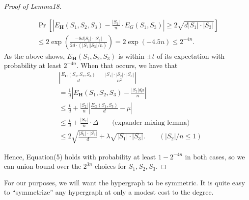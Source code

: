 \begin{proof}[Proof of Lemma18]
\begin{enumerate}
\begin{multline*}
\Pr\left[\left|E_{\mathbf H}(S_1,S_2,S_3)-\frac{|S_2|}n\cdot E_G(S_1,S_3)\right|\geq2\sqrt{d|S_1|\cdot|S_3|}\right]\\
\leq2\exp\left(\frac{-8d|S_1|\cdot|S_3|}{2d\cdot(|S_1||S_3|/n)}\right)=2\exp(-4.5n)\leq2^{-4n}.
\end{multline*}
As the above shows, $E_{\mathbf H}(S_1,S_2,S_3)$ is within $\pm t$ of its expectation with probability at least $2^{-4n}$. When that occurs, we have that
\begin{align*}
&\left|\frac{E_{\mathbf H}(S_1,S_2,S_3)}d-\frac{|S_1|\cdot|S_2|\cdot|S_3|}{n^2}\right|\\
&=\frac1d\left|E_{\mathbf H}(S_1,S_2,S_3)-\frac{|S_2|d\mu}n\right|\\
&\leq\frac td+\frac{|S_2|}n\left|\frac{E_G(S_1,S_3)}d-\mu\right|\\
&\leq\frac td+\frac{|S_2|}n\cdot\Delta\qquad\text{(expander mixing lemma)}\\
&\leq2\sqrt{\frac{|S_1|\cdot|S_3|}d}+\lambda\sqrt{|S_1|\cdot|S_3|}.\qquad(|S_2|/n\leq1)
\end{align*}
\end{enumerate}
Hence, Equation(5) holds with probability at least $1-2^{-4n}$ in both cases, so we can union bound over the $2^{3n}$ choices for $S_1,S_2,S_3$.
\end{proof}
For our purposes, we will want the hypergraph to be symmetric. It is quite easy to ``symmetrize'' any hypergraph at only a modest cost to the degree.
